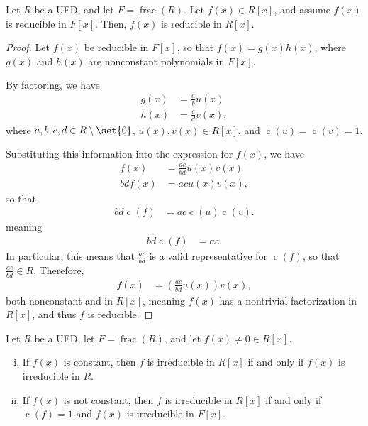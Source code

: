 \documentclass[10pt]{mypackage}
\begin{document}
\begin{corollary}
  Let $R$ be a UFD, and let $F = \operatorname{frac}\left( R \right)$. Let $f(x)\in R[x]$, and assume $f(x)$ is reducible in $F[x]$. Then, $f(x)$ is reducible in $R[x]$.
\end{corollary}
\begin{proof}
  Let $f(x)$ be reducible in $F[x]$, so that $f(x) = g(x)h(x)$, where $g(x)$ and $h(x)$ are nonconstant polynomials in $F[x]$.\newline

  By factoring, we have
  \begin{align*}
    g(x) &= \frac{a}{b}u(x)\\
    h(x) &= \frac{c}{d}v(x),
  \end{align*}
  where $a,b,c,d\in R\setminus \set{0}$, $u(x),v(x)\in R[x]$, and $ \operatorname{c}\left( u \right) = \operatorname{c}\left( v \right) = 1 $.\newline

  Substituting this information into the expression for $f(x)$, we have
  \begin{align*}
    f(x) &= \frac{ac}{bd}u(x)v(x)\\
    bd f(x) &= ac u(x)v(x),
  \end{align*}
  so that
  \begin{align*}
    bd \operatorname{c}\left( f \right)&= ac \operatorname{c}\left( u \right)\operatorname{c}\left( v \right).
  \end{align*}
  meaning
  \begin{align*}
    bd \operatorname{c}\left( f \right) &= ac.
  \end{align*}
  In particular, this means that $\frac{ac}{bd}$ is a valid representative for $\operatorname{c}\left( f \right)$, so that $ \frac{ac}{bd}\in R $. Therefore,
  \begin{align*}
    f(x) &= \left( \frac{ac}{bd}u(x) \right)v(x),
  \end{align*}
  both nonconstant and in $R[x]$, meaning $f(x)$ has a nontrivial factorization in $R[x]$, and thus $f$ is reducible.
\end{proof}
\begin{corollary}
  Let $R$ be a UFD, let $F = \operatorname{frac}\left( R \right)$, and let $f(x)\neq 0\in R[x]$.
  \begin{enumerate}[(i)]
    \item If $f(x)$ is constant, then $f$ is irreducible in $R[x]$ if and only if $f(x)$ is irreducible in $R$.
    \item If $f(x)$ is not constant, then $f$ is irreducible in $R[x]$ if and only if $\operatorname{c}\left( f \right) = 1$ and $f(x)$ is irreducible in $F[x]$.
  \end{enumerate}
\end{corollary}
\end{document}
